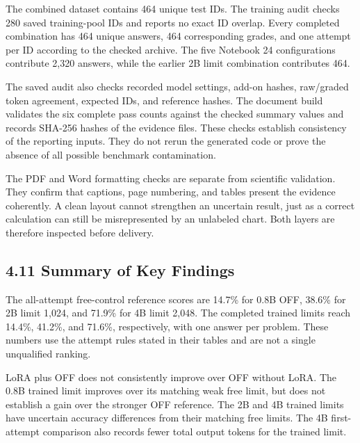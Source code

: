 \documentclass[11pt,letterpaper]{article}
\begin{document}
The combined dataset contains 464 unique test IDs. The training audit checks 280 saved training-pool IDs and reports no exact ID overlap. Every completed combination has 464 unique answers, 464 corresponding grades, and one attempt per ID according to the checked archive. The five Notebook 24 configurations contribute 2,320 answers, while the earlier 2B limit combination contributes 464.\par

The saved audit also checks recorded model settings, add-on hashes, raw/graded token agreement, expected IDs, and reference hashes. The document build validates the six complete pass counts against the checked summary values and records SHA-256 hashes of the evidence files. These checks establish consistency of the reporting inputs. They do not rerun the generated code or prove the absence of all possible benchmark contamination.\par

The PDF and Word formatting checks are separate from scientific validation. They confirm that captions, page numbering, and tables present the evidence coherently. A clean layout cannot strengthen an uncertain result, just as a correct calculation can still be misrepresented by an unlabeled chart. Both layers are therefore inspected before delivery.\par

\subsection*{4.11 Summary of Key Findings}

The all-attempt free-control reference scores are 14.7\% for 0.8B OFF, 38.6\% for 2B limit 1,024, and 71.9\% for 4B limit 2,048. The completed trained limits reach 14.4\%, 41.2\%, and 71.6\%, respectively, with one answer per problem. These numbers use the attempt rules stated in their tables and are not a single unqualified ranking.\par

LoRA plus OFF does not consistently improve over OFF without LoRA. The 0.8B trained limit improves over its matching weak free limit, but does not establish a gain over the stronger OFF reference. The 2B and 4B trained limits have uncertain accuracy differences from their matching free limits. The 4B first-attempt comparison also records fewer total output tokens for the trained limit.\par
\end{document}
